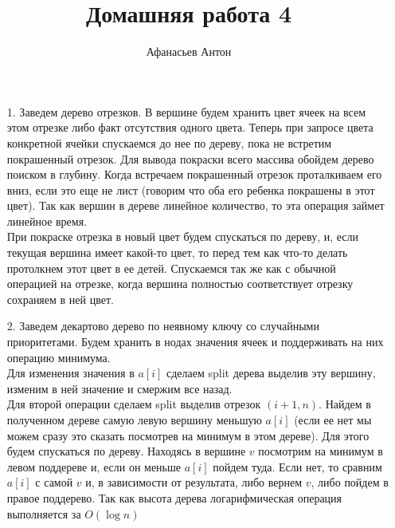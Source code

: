 \documentclass[10pt]{article}
\begin{document}
\title{Домашняя работа 4}
\author{Афанасьев Антон}
\maketitle

\begin{enumerate}
	\item[1.] Заведем дерево отрезков. В вершине будем хранить цвет ячеек на всем этом отрезке либо факт отсутствия одного цвета. Теперь при запросе цвета конкретной ячейки спускаемся до нее по дереву, пока не встретим покрашенный отрезок. Для вывода покраски всего массива обойдем дерево поиском в глубину. Когда встречаем покрашенный отрезок проталкиваем его вниз, если это еще не лист (говорим что оба его ребенка покрашены в этот цвет). Так как вершин в дереве линейное количество, то эта операция займет линейное время.\\
	При покраске отрезка в новый цвет будем спускаться по дереву, и, если текущая вершина имеет какой-то цвет, то перед тем как что-то делать протолкнем этот цвет в ее детей. Спускаемся так же как с обычной операцией на отрезке, когда вершина полностью соответствует отрезку сохраняем в ней цвет.
	
	\item[2.] Заведем декартово дерево по неявному ключу со случайными приоритетами. Будем хранить в нодах значения ячеек и поддерживать на них операцию минимума. \\
	Для изменения значения в $a[i]$ сделаем split дерева выделив эту вершину, изменим в ней значение и смержим все назад. \\
	Для второй операции сделаем split выделив отрезок $(i+1, n)$. Найдем в полученном дереве самую левую вершину меньшую $a[i]$ (если ее нет мы можем сразу это сказать посмотрев на минимум в этом дереве). Для этого будем спускаться по дереву. Находясь в вершине $v$ посмотрим на минимум в левом поддереве и, если он меньше $a[i]$ пойдем туда. Если нет, то сравним $a[i]$ с самой $v$ и, в зависимости от результата, либо вернем $v$, либо пойдем в правое поддерево. Так как высота дерева логарифмическая операция выполняется за $O(\log n)$

\end{enumerate}
\end{document}
